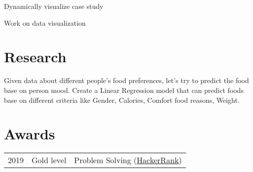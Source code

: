 \documentclass[]{deedy-resume-openfont}
\begin{document}
\begin{minipage}[t]{0.66\textwidth}
\vspace{\topsep}
\begin{tightemize}
\item Dynamically visualize case study
\item Work on data visualization
\end{tightemize}
\sectionsep


\section{Research}
Given data about different people's food preferences, let's try to predict the food base on person mood. Create a Linear Regression model that can predict foods base on different criteria like Gender, Calories, Comfort food reasons, Weight.
\sectionsep


\section{Awards} 
\begin{tabular}{rll}
2019	     & Gold level  & Problem Solving (\href{https://www.hackerrank.com/jinnatul}{HackerRank})\\
\end{tabular}
\sectionsep

\end{minipage} 
\end{document}

